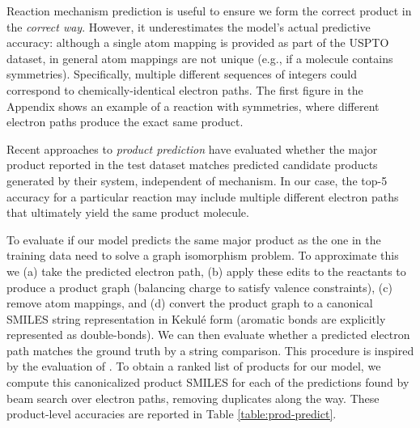 Reaction mechanism prediction is useful to ensure we form the correct product in the {\em correct way}.
However, it underestimates the model's actual predictive accuracy: although a single atom mapping is provided as part of the USPTO dataset, in general atom mappings are not unique (e.g., if a molecule contains symmetries). Specifically, multiple different sequences of integers could correspond to chemically-identical electron paths. 
The first figure in the Appendix shows an example of a reaction with symmetries, where different electron paths produce the exact same product. 

Recent approaches to {\em product prediction} \citep{jin2017predicting,schwaller2017found}
have evaluated whether the major product reported in the test dataset matches predicted candidate products generated by their system, independent of mechanism.
In our case, the top-5 accuracy for a particular reaction may include multiple different electron paths that ultimately yield the same product molecule.

To evaluate if our model predicts the same major product as the one in the training data need to solve a graph isomorphism problem. To approximate this 
we (a) take the predicted electron path, 
(b) apply these edits to the reactants to produce a product graph (balancing charge to satisfy valence constraints), 
(c) remove atom mappings,
and (d) convert the product graph to a canonical SMILES string representation in Kekul\'e form (aromatic bonds are explicitly represented as double-bonds). 
We can then evaluate whether a predicted electron path matches the ground truth by a string comparison. This procedure is inspired by the evaluation of \citet{schwaller2017found}. To obtain a ranked list of products for our model, we compute this canonicalized product SMILES for each of the predictions found by beam search over electron paths, removing duplicates along the way. 
These product-level accuracies are reported in Table \ref{table:prod-predict}.

